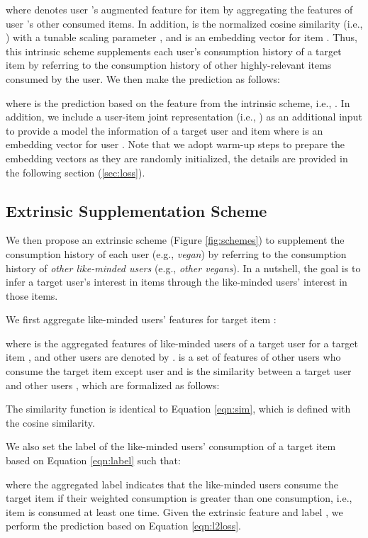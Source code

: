\documentclass[sigconf]{acmart}
\begin{document}
where  denotes user 's augmented feature for item  by aggregating the features of user 's other consumed items. In addition,  is the normalized cosine similarity (i.e.,  ) with a tunable scaling parameter , and  is an embedding vector for item . 
Thus, this intrinsic scheme supplements each user's consumption history of a target item by referring to the consumption history of other highly-relevant items consumed by the user.
We then make the prediction as follows:

where  is the prediction based on the feature from the intrinsic scheme, i.e., . In addition, we include a user-item joint representation (i.e., ) as an additional input to provide a model the information of a target user  and item  where  is an embedding vector for user . Note that we adopt warm-up steps to prepare the embedding vectors as they are randomly initialized, the details are provided in the following section (\cref{sec:loss}). 



\subsection{Extrinsic Supplementation Scheme}
\label{sec:ex}
We then propose an extrinsic scheme (Figure \ref{fig:schemes}) to supplement the consumption history of each user (e.g., \textit{vegan}) by referring to the consumption history of \textit{other like-minded users} (e.g., \textit{other vegans}). In a nutshell, the goal is to infer a target user's interest in items through the like-minded users' interest in those items. 

We first aggregate like-minded users' features for target item :

where  is the aggregated features of like-minded users of a target user  for a target item , and other users are denoted by .  is a set of features of other users who consume the target item  except user  and  is the similarity between a target user  and other users , which are formalized as follows:


The similarity function  is identical to Equation \ref{eqn:sim}, which is defined with the cosine similarity. 

We also set the label of the like-minded users' consumption of a target item  based on Equation \ref{eqn:label} such that:

where the aggregated label  indicates that the like-minded users consume the target item  if their weighted consumption is greater than one consumption, i.e., item  is consumed at least one time. 
Given the extrinsic feature  and label , we perform the prediction based on Equation \ref{eqn:l2loss}.
\end{document}
